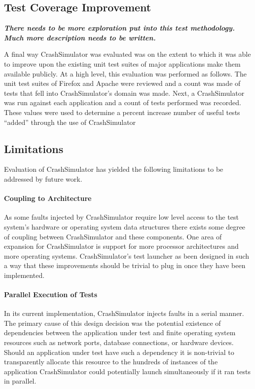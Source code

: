     \subsection{Test Coverage Improvement}

        \textbf{\emph{There needs to be more exploration put into this test methodology. Much more description needs to
        be written.}}

        A final way CrashSimulator was evaluated was on the extent to which it was able to improve upon the existing
        unit test suites of major applications make them available publicly. At a high level, this evaluation was
        performed as follows. The unit test suites of Firefox and Apache were reviewed and a count was made of tests
        that fell into CrashSimulator's domain was made. Next, a CrashSimulator was run against each application and a
        count of tests performed was recorded. These values were used to determine a percent increase number of useful
        tests ``added'' through the use of CrashSimulator

    \subsection{Limitations}

        Evaluation of CrashSimulator has yielded the following limitations to be addressed by future work.

        \paragraph{Coupling to Architecture}

            As some faults injected by CrashSimulator require low level access to the test system's hardware or
            operating system data structures there exists some degree of coupling between CrashSimulator and these
            components. One area of expansion for CrashSimulator is support for more processor architectures and more
            operating systems.  CrashSimulator's test launcher as been designed in such a way that these improvements
            should be trivial to plug in once they have been implemented.

        \paragraph{Parallel Execution of Tests}

            In its current implementation, CrashSimulator injects faults in a serial manner. The primary cause of this
            design decision was the potential existence of dependencies between the application under test and finite
            operating system resources such as network ports, database connections, or hardware devices. Should an
            application under test have such a dependency it is non-trivial to transparently allocate this resource to
            the hundreds of instances of the application CrashSimulator could potentially launch simultaneously if it
            ran tests in parallel.

